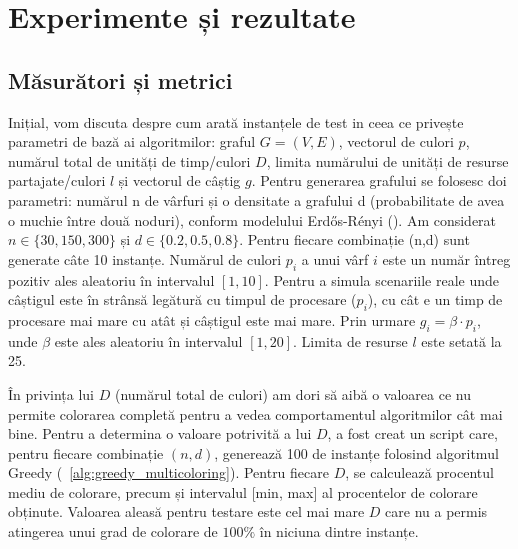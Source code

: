 \chapter{Experimente și rezultate}

\section{Măsurători și metrici}
Inițial, vom discuta despre cum arată instanțele de test in ceea ce privește parametri de bază ai algoritmilor: graful $G=(V,E)$, vectorul de culori $p$, numărul total de unități de timp/culori $D$, limita numărului de unități de resurse partajate/culori $l$ și vectorul de câștig $g$. Pentru generarea grafului se folosesc doi parametri: numărul n de vârfuri și o densitate a grafului d (probabilitate de avea o muchie între două noduri), conform modelului Erdős-Rényi (\cite{erdos1959random}).  Am considerat $n \in \{30,150,300\}$ și $d \in \{0.2, 0.5, 0.8\}$. Pentru fiecare combinație (n,d) sunt generate câte 10 instanțe. Numărul de culori $p_i$ a unui vârf $i$ este un număr întreg pozitiv ales aleatoriu în intervalul $[1,10]$. Pentru a simula scenariile reale unde câștigul este în strânsă legătură cu timpul de procesare ($p_i$), cu cât e un timp de procesare mai mare cu atât și câștigul este mai mare. Prin urmare $g_i = \beta \cdot p_i$, unde $\beta$ este ales aleatoriu în intervalul $[1,20]$. Limita de resurse $l$ este setată la 25.

În privința lui $D$ (numărul total de culori) am dori să aibă o valoarea ce nu permite colorarea completă pentru a vedea comportamentul algoritmilor cât mai bine.
Pentru a determina o valoare potrivită a lui $D$, a fost creat un script care, pentru fiecare combinație $(n, d)$, generează 100 de instanțe folosind algoritmul Greedy (~\ref{alg:greedy_multicoloring}). Pentru fiecare $D$, se calculează procentul mediu de colorare, precum și intervalul [min, max] al procentelor de colorare obținute. Valoarea aleasă pentru testare este cel mai mare $D$ care nu a permis atingerea unui grad de colorare de $100\%$ în niciuna dintre instanțe. 


